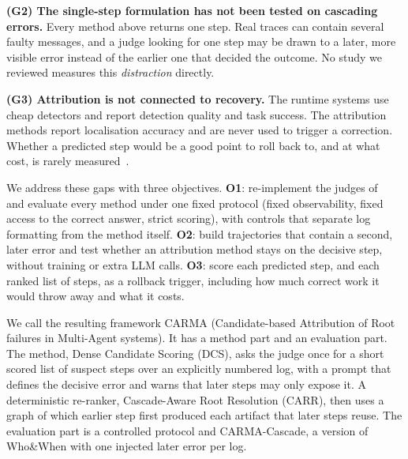 \documentclass[conference]{IEEEtran}
\begin{document}
\textbf{(G2) The single-step formulation has not been tested on cascading errors.} Every method above returns one step. Real traces can contain several faulty messages, and a judge looking for one step may be drawn to a later, more visible error instead of the earlier one that decided the outcome. No study we reviewed measures this \emph{distraction} directly.

\textbf{(G3) Attribution is not connected to recovery.} The runtime systems use cheap detectors and report detection quality and task success. The attribution methods report localisation accuracy and are never used to trigger a correction. Whether a predicted step would be a good point to roll back to, and at what cost, is rarely measured~\cite{feng2026conformal,shen2026masc,zhang2026eager}.

We address these gaps with three objectives. \textbf{O1}: re-implement the judges of~\cite{zhang2025whowhen} and evaluate every method under one fixed protocol (fixed observability, fixed access to the correct answer, strict scoring), with controls that separate log formatting from the method itself. \textbf{O2}: build trajectories that contain a second, later error and test whether an attribution method stays on the decisive step, without training or extra LLM calls. \textbf{O3}: score each predicted step, and each ranked list of steps, as a rollback trigger, including how much correct work it would throw away and what it costs.

We call the resulting framework CARMA (Candidate-based Attribution of Root failures in Multi-Agent systems). It has a method part and an evaluation part. The method, Dense Candidate Scoring (DCS), asks the judge once for a short scored list of suspect steps over an explicitly numbered log, with a prompt that defines the decisive error and warns that later steps may only expose it. A deterministic re-ranker, Cascade-Aware Root Resolution (CARR), then uses a graph of which earlier step first produced each artifact that later steps reuse. The evaluation part is a controlled protocol and CARMA-Cascade, a version of Who\&When with one injected later error per log.
\end{document}
